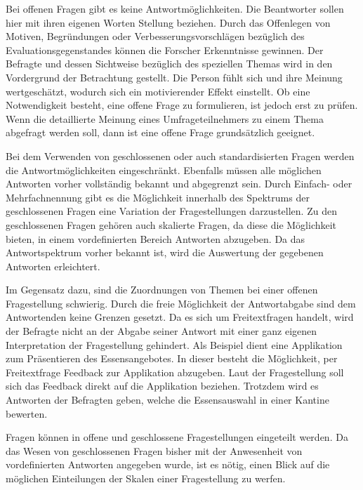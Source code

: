 Bei offenen Fragen gibt es keine Antwortmöglichkeiten.
Die Beantworter sollen hier mit ihren eigenen Worten Stellung beziehen.
Durch das Offenlegen von Motiven, Begründungen oder Verbesserungsvorschlägen bezüglich des Evaluationsgegenstandes können die Forscher Erkenntnisse gewinnen.
Der Befragte und dessen Sichtweise bezüglich des speziellen Themas wird in den Vordergrund der Betrachtung gestellt.\autocite[Vgl.][S. 31]{2009Fragebogen} %
Die Person fühlt sich und ihre Meinung wertgeschätzt, wodurch sich ein motivierender Effekt einstellt.
Ob eine Notwendigkeit besteht, eine offene Frage zu formulieren, ist jedoch erst zu prüfen.
Wenn die detaillierte Meinung eines Umfrageteilnehmers zu einem Thema abgefragt werden soll, dann ist eine offene Frage grundsätzlich geeignet. 
 
Bei dem Verwenden von geschlossenen oder auch standardisierten Fragen werden die Antwortmöglichkeiten eingeschränkt.
Ebenfalls müssen alle möglichen Antworten vorher vollständig bekannt und abgegrenzt sein.\autocite[Vgl.][S. 66]{2014Fragebogen} %
Durch Einfach- oder Mehrfachnennung gibt es die Möglichkeit innerhalb des Spektrums der geschlossenen Fragen eine Variation der Fragestellungen darzustellen.\autocite[Vgl.][S. 31]{2009Fragebogen} %
Zu den geschlossenen Fragen gehören auch skalierte Fragen, da diese die Möglichkeit bieten, in einem vordefinierten Bereich Antworten abzugeben.
Da das Antwortspektrum vorher bekannt ist, wird die Auswertung der gegebenen Antworten erleichtert.

Im Gegensatz dazu, sind die Zuordnungen von Themen bei einer offenen Fragestellung schwierig.
Durch die freie Möglichkeit der Antwortabgabe sind dem Antwortenden keine Grenzen gesetzt.
Da es sich um Freitextfragen handelt, wird der Befragte nicht an der Abgabe seiner Antwort mit einer ganz eigenen Interpretation der Fragestellung gehindert. 
Als Beispiel dient eine Applikation zum Präsentieren des Essensangebotes.
In dieser besteht die Möglichkeit, per Freitextfrage Feedback zur Applikation abzugeben.
Laut der Fragestellung soll sich das Feedback direkt auf die Applikation beziehen.
Trotzdem wird es Antworten der Befragten geben, welche die Essensauswahl in einer Kantine bewerten. %

Fragen können in offene und geschlossene Fragestellungen eingeteilt werden. %
Da das Wesen von geschlossenen Fragen bisher mit der Anwesenheit von vordefinierten Antworten angegeben wurde, ist es nötig, einen Blick auf die möglichen Einteilungen der Skalen einer Fragestellung zu werfen.

